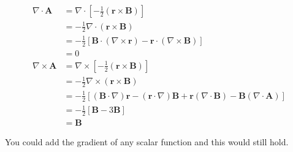 \documentclass{article}
\renewcommand{\vec}[1]{\boldsymbol{\mathbf{#1}}}
\begin{document}
\begin{align*}
  \nabla \cdot \vec{A}  & = \nabla \cdot \left[ -\frac{1}{2} (\vec{r} \times \vec{B}) \right]                                                                                \\
                        & = -\frac{1}{2} \nabla \cdot (\vec{r} \times \vec{B})                                                                                               \\
                        & = -\frac{1}{2} \left[ \vec{B} \cdot (\nabla \times \vec{r}) - \vec{r} \cdot (\nabla \times \vec{B}) \right]                                        \\
                        & = 0                                                                                                                                                \\
  \nabla \times \vec{A} & = \nabla \times \left[ -\frac{1}{2} (\vec{r} \times \vec{B}) \right]                                                                               \\
                        & = -\frac{1}{2} \nabla \times (\vec{r} \times \vec{B})                                                                                              \\
                        & = -\frac{1}{2} [(\vec{B} \cdot \nabla) \vec{r} - (\vec{r} \cdot \nabla) \vec{B} + \vec{r} (\nabla \cdot \vec{B}) - \vec{B} (\nabla \cdot \vec{A})] \\
                        & = -\frac{1}{2} [\vec{B} - 3 \vec{B}]                                                                                                               \\
                        & = \vec{B}
\end{align*}

You could add the gradient of any scalar function and this would still hold.

\subsection{}
\end{document}
